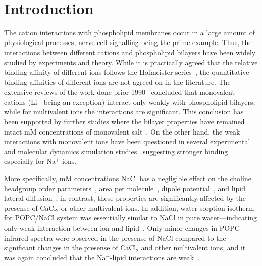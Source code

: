 \documentclass[pre,aps,floatfix,authordate1-4,twocolumn]{revtex4-1}
\begin{document}
\maketitle


~\vspace{0.3cm}\\
{\it \bf} 

\section{Introduction}

The cation interactions with phospholipid membranes occur in a large amount
of physiological processes, nerve cell signalling being the prime example.
Thus, the interactions between different cations and phospholipid bilayers have been widely studied by experiments
and theory. While it is practically agreed that the relative binding affinity of different
ions follows the Hofmeister series~\cite{eisenberg79,cevc90,tocanne90,binder02,celma07,leontidis09,vacha09a,klasczyk10,harb13}, the quantitative binding affinities of different
ions are not agreed on in the literature. The extensive reviews of the work done prior 1990~\cite{cevc90,tocanne90}
concluded that monovalent cations (Li$^+$ being an exception) interact only weakly with phospholipid bilayers, 
while for multivalent ions the interactions are significant. This conclusion has been supported by
further studies where the bilayer properties have remained intact mM concentrations of monovalent 
salt~\cite{binder02,pabst07,filippov09}. On the other hand, the weak interactions with monovalent ions
have been questioned in several experimental and molecular dynamics simulation 
studies~\cite{bockmann03,bockmann04,vacha09a,manyes05,manyes06,fukuma07,leontidis09,ferber11,morata12,klasczyk10,harb13}
suggesting stronger binding especially for Na$^{+}$ ions.

More specifically, mM concentrations NaCl has a negligible effect on the
choline headgroup order parameters~\cite{akutsu81}, area per molecule~\cite{pabst07}, dipole potential~\cite{clarke99},
and lipid lateral diffusion~\cite{filippov09}; in contrast, these properties are significantly affected by the presense
of CaCl$_2$ or other multivalent ions. In addition, water sorption isotherm for POPC/NaCl system
was essentially similar to NaCl in pure water---indicating only weak interaction between ion and lipid~\cite{binder02}.
Only minor changes in POPC infrared spectra were observed in the presense of NaCl compared to the significant 
changes in the presense of CaCl$_2$ and other multivalent ions, and it was again concluded that the Na$^+$-lipid interactions are weak~\cite{binder02}.
\end{document}
